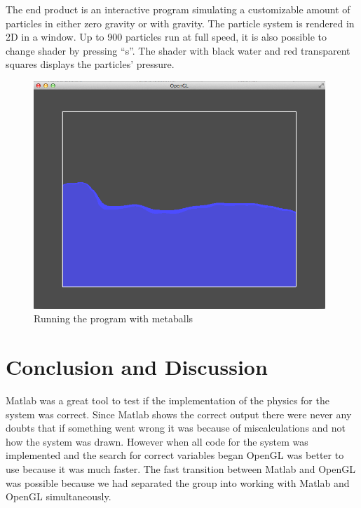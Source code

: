 \documentclass[a4paper,12pt,twoside,final]{report}
\begin{document}
\noindent The end product is an interactive program simulating a customizable amount of particles in either zero gravity or with gravity. The particle system is rendered in 2D in a window. Up to 900 particles run at full speed, it is also possible to change shader by pressing “s”. The shader with black water and red transparent squares displays the particles’ pressure. \\

\begin{figure}[H]
\begin{center}
    \includegraphics[width=11cm]{figs/image_1.png} 
\end{center}
\caption{Running the program with metaballs}
\label{model_block}
\end{figure}



\chapter{Conclusion and Discussion}

Matlab was a great tool to test if the implementation of the physics for the system was correct. Since Matlab shows the correct output there were never any doubts that if something went wrong it was because of miscalculations and not how the system was drawn. However when all code for the system was implemented and the search for correct variables began OpenGL was better to use because it was much faster. The fast transition between Matlab and OpenGL was possible because we had separated the group into working with Matlab and OpenGL simultaneously. \\
\end{document}
